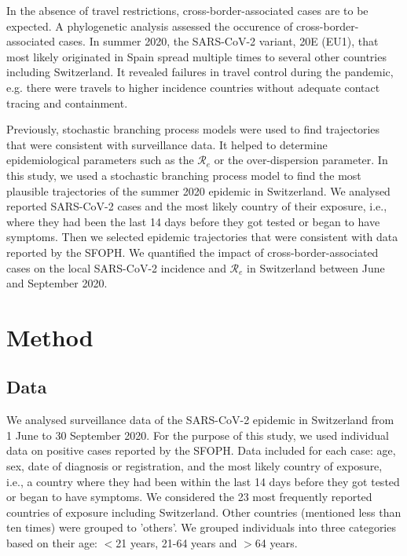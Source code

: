 \documentclass[10pt, a4paper, twoside]{article}
\begin{document}
\begin{multicols}{2}
In the absence of travel restrictions, cross-border-associated cases are to be expected.\cite{russell_effect_2021} 
A phylogenetic analysis assessed the occurence of cross-border-associated cases.\cite{hodcroft_emergence_2020}
In summer 2020, the SARS-CoV-2 variant, 20E (EU1), that most likely originated in Spain spread multiple times to several other countries including Switzerland.\cite{hodcroft_emergence_2020}
It revealed failures in travel control during the pandemic, e.g. there were travels to higher incidence countries without adequate contact tracing and containment.\cite{hodcroft_emergence_2020}

Previously, stochastic branching process models were used to find trajectories that were consistent with surveillance data.\cite{althaus_ebola_2015,riou_pattern_2020}
It helped to determine epidemiological parameters such as the $\mathcal{R}_e$ or the over-dispersion parameter.\cite{althaus_ebola_2015,riou_pattern_2020}
In this study, we used a stochastic branching process model to find the most plausible trajectories of the summer 2020 epidemic in Switzerland.
We analysed reported SARS-CoV-2 cases and the most likely country of their exposure, i.e., where they had been the last 14 days before they got tested or began to have symptoms.
Then we selected epidemic trajectories that were consistent with data reported by the SFOPH.
We quantified the impact of cross-border-associated cases on the local SARS-CoV-2 incidence and $\mathcal{R}_e$ in Switzerland between June and September 2020.

\section{Method}

\subsection{Data}
We analysed surveillance data of the SARS-CoV-2 epidemic in Switzerland from 1 June to 30 September 2020. 
For the purpose of this study, we used individual data on positive cases reported by the SFOPH. 
Data included for each case: age, sex, date of diagnosis or registration, and the most likely country of exposure, i.e., a country where they had been within the last 14 days before they got tested or began to have symptoms.
We considered the 23 most frequently reported countries of exposure including Switzerland.
Other countries (mentioned less than ten times) were grouped to 'others'.
We grouped individuals into three categories based on their age: $<$21 years, 21-64 years and  $>$64 years.


\end{multicols}
\end{document}

